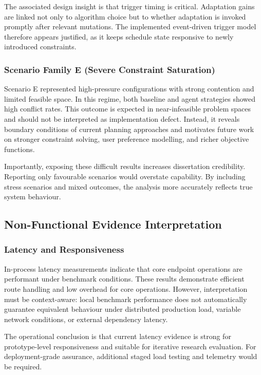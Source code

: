 \documentclass[12pt]{article}
\begin{document}
The associated design insight is that trigger timing is critical. Adaptation gains are linked not only to algorithm choice but to whether adaptation is invoked promptly after relevant mutations. The implemented event-driven trigger model therefore appears justified, as it keeps schedule state responsive to newly introduced constraints.

\subsubsection{Scenario Family E (Severe Constraint Saturation)}
Scenario E represented high-pressure configurations with strong contention and limited feasible space. In this regime, both baseline and agent strategies showed high conflict rates. This outcome is expected in near-infeasible problem spaces and should not be interpreted as implementation defect. Instead, it reveals boundary conditions of current planning approaches and motivates future work on stronger constraint solving, user preference modelling, and richer objective functions.

Importantly, exposing these difficult results increases dissertation credibility. Reporting only favourable scenarios would overstate capability. By including stress scenarios and mixed outcomes, the analysis more accurately reflects true system behaviour.

\subsection{Non-Functional Evidence Interpretation}
\subsubsection{Latency and Responsiveness}
In-process latency measurements indicate that core endpoint operations are performant under benchmark conditions. These results demonstrate efficient route handling and low overhead for core operations. However, interpretation must be context-aware: local benchmark performance does not automatically guarantee equivalent behaviour under distributed production load, variable network conditions, or external dependency latency.

The operational conclusion is that current latency evidence is strong for prototype-level responsiveness and suitable for iterative research evaluation. For deployment-grade assurance, additional staged load testing and telemetry would be required.
\end{document}
